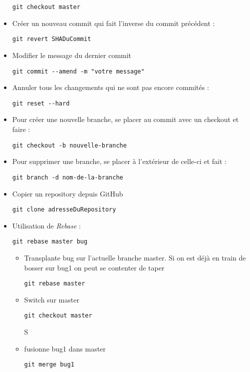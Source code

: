 \documentclass[12pt,a4paper]{article}
\begin{document}
\begin{itemize}
\begin{lstlisting}
git checkout master
\end{lstlisting}
\item Créer un nouveau commit qui fait l'inverse du commit précédent :
\begin{lstlisting}
git revert SHADuCommit
\end{lstlisting}
\item Modifier le message du dernier commit
\begin{lstlisting}
git commit --amend -m "votre message"
\end{lstlisting}
\item Annuler tous les changements qui ne sont pas encore commités :
\begin{lstlisting}
git reset --hard
\end{lstlisting}
\item Pour créer une nouvelle branche, se placer au commit avec un checkout et faire :
\begin{lstlisting}
git checkout -b nouvelle-branche
\end{lstlisting}
\item Pour supprimer une branche, se placer à l'extérieur de celle-ci et fait :
\begin{lstlisting}
git branch -d nom-de-la-branche
\end{lstlisting}
\item Copier un repository depuis GitHub
\begin{lstlisting}
git clone adresseDuRepository
\end{lstlisting}
\item Utilisation de \textit{Rebase} :
\begin{lstlisting}
git rebase master bug
\end{lstlisting}
\begin{itemize}
\item Transplante bug sur l'actuelle branche master. Si on est déjà en train de bosser sur bug1 on peut se contenter de taper 
\begin{lstlisting}
git rebase master
\end{lstlisting}
\item Switch sur master
\begin{lstlisting}
git checkout master
\end{lstlisting}S
\item fusionne bug1 dans master
\begin{lstlisting}
git merge bug1
\end{lstlisting}

\end{itemize}
\end{itemize}
\end{document}
